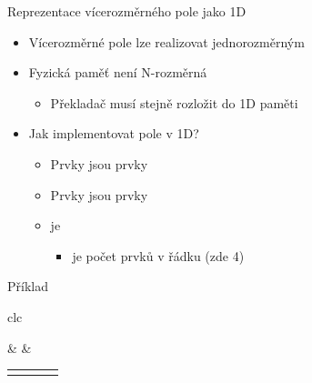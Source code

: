 \begin{frame}{Reprezentace vícerozměrného pole jako 1D}

  \begin{itemize}
    \item Vícerozměrné pole lze realizovat jednorozměrným

    \pause

    \item Fyzická paměť není N-rozměrná
    \begin{itemize}
      \item Překladač musí stejně rozložit do 1D paměti
    \end{itemize}

    \pause

    \item Jak implementovat pole  v 1D?
    \begin{itemize}
      \item Prvky  jsou prvky 
      \item Prvky  jsou prvky 

      \pause

      \item {} je 
      \begin{itemize}
	\item {} je počet prvků v řádku (zde 4)
      \end{itemize}
    \end{itemize}

  \end{itemize}


\begin{block}{Příklad}
\begin{center}
\setlength{\tabcolsep}{3pt}
\begin{tabular}{clc}

\small
{} & &  \\
\scriptsize
\setlength{\tabcolsep}{0.5pt}
\begin{tabular}{|c|c|c|c|} \hline
\cellcolor{green} \code{[0][0]} & \cellcolor{green} \code{[0][1]} & \cellcolor{green} \code{[0][2]} & \cellcolor{green} \code{[0][3]} \\ \hline
\cellcolor{cyan} \code{[1][0]} & \cellcolor{cyan} \code{[1][1]} & \cellcolor{cyan} \code{[1][2]} & \cellcolor{cyan} \code{[1][3]} \\ \hline
\end{tabular}


\end{tabular}
\end{center}
\end{block}
\end{frame}
